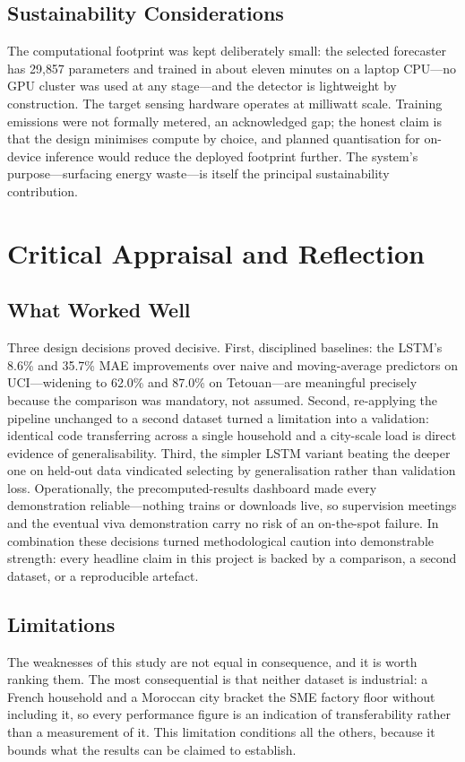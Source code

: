 \documentclass[11pt,a4paper]{article}
\begin{document}
\subsection{Sustainability Considerations}
The computational footprint was kept deliberately small: the selected forecaster
has 29{,}857 parameters and trained in about eleven minutes on a laptop
CPU---no GPU cluster was used at any stage---and the detector is lightweight by
construction. The target sensing hardware operates at milliwatt scale. Training
emissions were not formally metered, an acknowledged gap; the honest claim is
that the design minimises compute by choice, and planned quantisation for
on-device inference would reduce the deployed footprint further. The system's
purpose---surfacing energy waste---is itself the principal sustainability
contribution.

\section{Critical Appraisal and Reflection}

\subsection{What Worked Well}
Three design decisions proved decisive. First, disciplined baselines: the
LSTM's 8.6\% and 35.7\% MAE improvements over naive and moving-average
predictors on UCI---widening to 62.0\% and 87.0\% on Tetouan---are meaningful
precisely because the comparison was mandatory, not assumed. Second,
re-applying the pipeline unchanged to a second dataset turned a limitation into
a validation: identical code transferring across a single household and a
city-scale load is direct evidence of generalisability. Third, the simpler LSTM
variant beating the deeper one on held-out data vindicated selecting by
generalisation rather than validation loss. Operationally, the
precomputed-results dashboard made every demonstration reliable---nothing
trains or downloads live, so supervision meetings and the eventual viva
demonstration carry no risk of an on-the-spot failure. In combination these decisions turned methodological caution into demonstrable strength: every headline claim in this project is backed by a comparison, a second dataset, or a reproducible artefact.

\subsection{Limitations}
The weaknesses of this study are not equal in consequence, and it is worth
ranking them. The most consequential is that neither dataset is industrial: a
French household and a Moroccan city bracket the SME factory floor without
including it, so every performance figure is an indication of transferability
rather than a measurement of it. This limitation conditions all the others,
because it bounds what the results can be claimed to establish.
\end{document}
